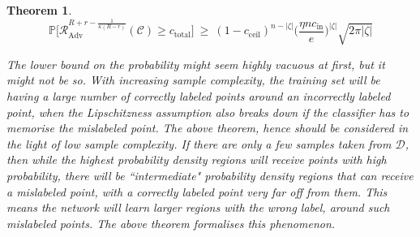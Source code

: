 \documentclass{ociamthesis}
\newtheorem{theorem}{Theorem}
\begin{document}
\begin{theorem}
    \begin{equation*}
        \mathbb{P} \biggl [
        \mathcal{R}_{\text{Adv}}^{R+r-\frac{1}{\kappa(R-r)}}
        (\mathcal{C}) \geq
        c_{\text{total}} 
        \biggr ]
        ~ \geq ~
        (1-c_{\text{ceil}})^{n-|\zeta|}
        \biggl (
            \frac{\eta n c_{\text{in}}}{e}
        \biggr )^{|\zeta|}
        \sqrt{2 \pi |\zeta|}
    \end{equation*}

    The lower bound on the probability might seem highly vacuous at first, but
    it might not be so. With increasing sample complexity, the training set will
    be having a large number of correctly labeled points around an incorrectly
    labeled point, when the Lipschitzness assumption also breaks down if the
    classifier has to memorise the mislabeled point. The above theorem, hence
    should be considered in the light of low sample complexity. If there are
    only a few samples taken from $\mathcal{D}$, then while the highest
    probability density regions will receive points with high probability, there
    will be ``intermediate" probability density regions that can receive a
    mislabeled point, with a correctly labeled point very far off from them.
    This means the network will learn larger regions with the wrong label,
    around such mislabeled points. The above theorem formalises this phenomenon.
\end{theorem}
\end{document}
